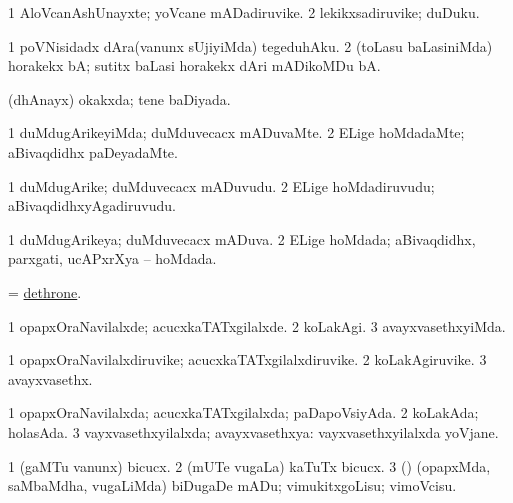 \bentry
{} 
\gl{\nA}
\expl{}
\bmng
\bnum
\num{1} AloVcanAshUnayxte; yoVcane mADadiruvike. 
\num{2} lekikxsadiruvike; duDuku. 
\enum
\emng
\eentry

\bentry
{} 
\gl{\sakirx}
\expl{}
\bmng
\bnum
\num{1} poVNisidadx dAra(vanunx sUjiyiMda) tegeduhAku. 
\num{2} (toLasu baLasiniMda) horakekx bA; sutitx baLasi horakekx dAri mADikoMDu bA. 
\enum
\emng
\eentry

\bentry
{} 
\gl{\gu}
\expl{}
\bmng
(dhAnayx) okakxda; tene baDiyada. 
\emng
\eentry

\bentry
{} 
\gl{\kirxvi}
\bmng
\bnum
\num{1} duMdugArikeyiMda; duMduvecacx mADuvaMte. 
\num{2} ELige hoMdadaMte; aBivaqdidhx paDeyadaMte. 
\enum
\emng
\eentry

\bentry
{} 
\gl{\nA}
\expl{}
\bmng
\bnum
\num{1} duMdugArike; duMduvecacx mADuvudu. 
\num{2} ELige hoMdadiruvudu; aBivaqdidhxyAgadiruvudu. 
\enum
\emng
\eentry

\bentry
{} 
\gl{\gu}
\expl{}
\bmng
\bnum
\num{1} duMdugArikeya; duMduvecacx mADuva. 
\num{2} ELige hoMdada; aBivaqdidhx, parxgati, ucAPxrXya -- hoMdada. 
\enum
\emng
\eentry

\bentry
{} 
\gl{\sakirx}
\expl{}
\bmng
= \hyperref{kandict_d.pdf}{D}{dethrone}{dethrone}. 
\emng
\eentry

\bentry
{} 
\gl{\kirxvi}
\bmng
\bnum
\num{1} opapxOraNavilalxde; acucxkaTATxgilalxde. 
\num{2} koLakAgi. 
\num{3} avayxvasethxyiMda. 
\enum
\emng
\eentry

\bentry
{} 
\gl{\nA}
\expl{}
\bmng
\bnum
\num{1} opapxOraNavilalxdiruvike; acucxkaTATxgilalxdiruvike. 
\num{2} koLakAgiruvike. 
\num{3} avayxvasethx. 
\enum
\emng
\eentry

\bentry
{} 
\gl{\gu}
\bmng
\bnum
\num{1} opapxOraNavilalxda; acucxkaTATxgilalxda; paDapoVsiyAda. 
\num{2} koLakAda; holasAda. 
\num{3} vayxvasethxyilalxda; avayxvasethxya:  vayxvasethxyilalxda yoVjane. 
\enum
\emng
\eentry

\bentry
{} 
\gl{\akirx}
\bmng
\bnum
\num{1} (gaMTu \mo vanunx) bicucx. 
\num{2} (mUTe \mo vugaLa) kaTuTx bicucx. 
\num{3} (\rUpa) (opapxMda, saMbaMdha, \mo vugaLiMda) biDugaDe mADu; vimukitxgoLisu; vimoVcisu. 
\enum
\emng
\eentry


